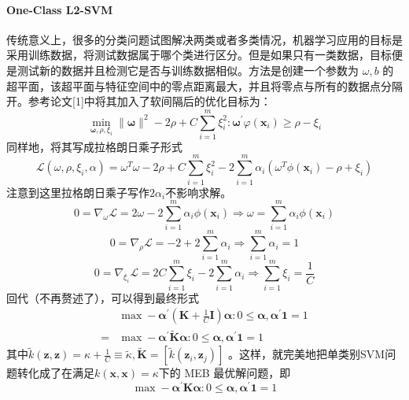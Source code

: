 \documentclass[UTF8, fleqn,10pt]{SelfArx} %
\begin{document}
		\paragraph{One-Class L2-SVM}传统意义上，很多的分类问题试图解决两类或者多类情况，机器学习应用的目标是采用训练数据，将测试数据属于哪个类进行区分。但是如果只有一类数据，目标便是测试新的数据并且检测它是否与训练数据相似。方法是创建一个参数为 $\omega, b$ 的超平面，该超平面与特征空间中的零点距离最大，并且将零点与所有的数据点分隔开。参考论文[1]中将其加入了软间隔后的优化目标为：
		\begin{equation}
		\min _{\mathbf{\omega}, \rho, \xi_{i}}\|\mathbf{\omega}\|^{2}-2 \rho+C \sum_{i=1}^{m} \xi_{i}^{2}: \mathbf{\omega}^{\prime} \varphi\left(\mathbf{x}_{i}\right) \geq \rho-\xi_{i}
		\end{equation}
		同样地，将其写成拉格朗日乘子形式
		$$
		\mathcal{L}(\omega, \rho, \xi_i, \alpha)= \omega^T\omega - 2\rho + C\sum_{i=1}^{m}\xi_{i}^2 - 2\sum_{i=1}^{m}\alpha_{i}(\omega^T\phi(\mathbf{x}_{i}) - \rho + \xi_i)
		$$
		注意到这里拉格朗日乘子写作$2\alpha_{i}$不影响求解。
		$$0=\nabla_{\omega} \mathcal{L}=2\omega -2\sum_{i=1}^{m}\alpha_{i}\phi(\mathbf{x}_{i}) \Rightarrow \omega = \sum_{i=1}^{m}\alpha_{i}\phi(\mathbf{x}_{i})$$
		$$0=\nabla_{\rho} \mathcal{L}=-2 + 2\sum_{i=1}^{m}\alpha_{i} \Rightarrow \sum_{i=1}^{m}\alpha_{i} = 1$$
		$$0=\nabla_{\xi_i} \mathcal{L}=2C\sum_{i=1}^{m}\xi_i - 2\sum_{i=1}^{m}\alpha_{i} \Rightarrow \sum_{i=1}^{m}\xi_{i} = \frac{1}{C}$$
		回代（不再赘述了），可以得到最终形式
		\begin{equation}
		\begin{aligned} & \max -\boldsymbol{\alpha}^{\prime}\left(\mathbf{K}+\frac{1}{C} \mathbf{I}\right) \boldsymbol{\alpha}: 0 \leq \boldsymbol{\alpha}, \boldsymbol{\alpha}^{\prime} \mathbf{1}=1 \\=& \max -\boldsymbol{\alpha}^{\prime} \tilde{\mathbf{K}} \boldsymbol{\alpha}: 0 \leq \boldsymbol{\alpha}, \boldsymbol{\alpha}^{\prime} \mathbf{1}=1 \end{aligned}
		\end{equation}其中$
		\tilde{k}(\mathbf{z}, \mathbf{z})=\kappa+\frac{1}{C} \equiv \tilde{\kappa}, \tilde{\mathbf{K}}=\left[\tilde{k}\left(\mathbf{z}_{i}, \mathbf{z}_{j}\right)\right]
		$
		。这样，就完美地把单类别SVM问题转化成了在满足$k(\mathbf{x}, \mathbf{x})=\kappa$下的 MEB 最优解问题，即
		\begin{equation}
		\max -\boldsymbol{\alpha}^{\prime} \mathbf{K} \boldsymbol{\alpha}: 0 \leq \boldsymbol{\alpha}, \boldsymbol{\alpha}^{\prime} \mathbf{1}=1
		\end{equation}
\end{document}
